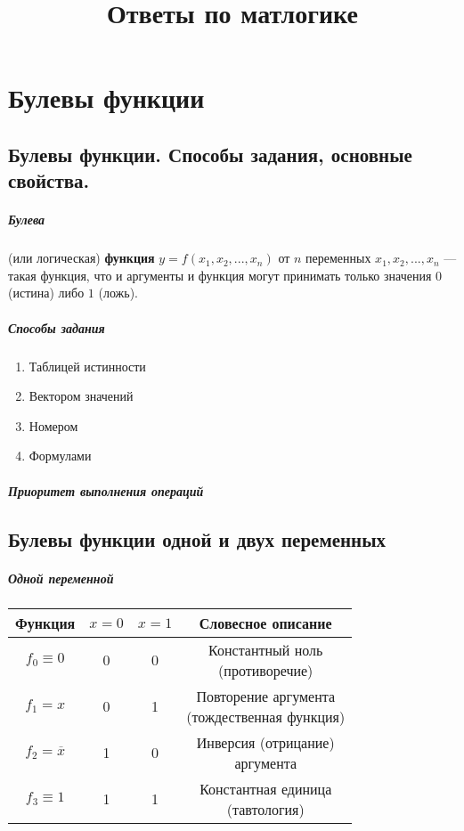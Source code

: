 \documentclass[14pt, a4paper]{extarticle}
\begin{document}
\title{Ответы по матлогике}
\maketitle

\newcommand{\itembf}[1]{\item \textbf{#1}}
\newtheorem*{defin}{Определение}
\newtheorem*{theorem}{Теорема}

\newpage
\tableofcontents
\newpage

\section{Булевы функции}
\subsection{Булевы функции. Способы задания, основные свойства.}

\subparagraph{Булева} (или логическая) \textbf{функция} $y=f(x_1, x_2, ..., x_n)$ от $n$  переменных $x_1, x_2, ..., x_n$ --- такая функция, что и аргументы и функция могут принимать только значения $0$ (истина) либо $1$ (ложь).

\subparagraph{Способы задания}
\begin{enumerate}
  \item {Таблицей истинности}
  \item {Вектором значений}
  \item {Номером}
  \item {Формулами}
\end{enumerate}
\subparagraph{Приоритет выполнения операций}

\subsection{Булевы функции одной и двух переменных}

\subparagraph{Одной переменной}


\begin{center}
\begin{tabular}{|c|c|c|c|}
  \hline
  Функция & $x=0$ & $x=1$ & Словесное описание \\
  \hline
  $f_0 \equiv 0$ & 0 & 0 & \makecell{Константный ноль\\(противоречие)} \\
  \hline
  $f_1 = x$ & 0 & 1 & \makecell{Повторение аргумента \\ (тождественная функция)} \\
  \hline
  $f_2 = \overline x$ & 1 & 0 & \makecell{Инверсия (отрицание)\\ аргумента} \\
  \hline
  $f_3 \equiv 1$ & 1 & 1 & \makecell{Константная единица\\(тавтология)} \\
  \hline
\end{tabular}
\end{center}
\end{document}
